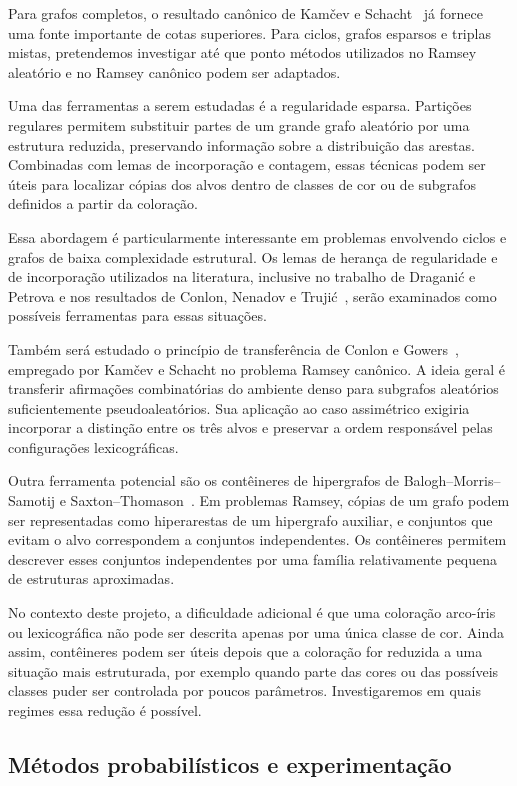 \documentclass[11pt,a4paper]{article}
\theoremstyle{plain}
\theoremstyle{definition}
\begin{document}
Para grafos completos, o resultado canônico de Kamčev e
Schacht~\cite{KS} já fornece uma fonte importante de cotas superiores.
Para ciclos, grafos esparsos e triplas mistas, pretendemos investigar
até que ponto métodos utilizados no Ramsey aleatório e no Ramsey
canônico podem ser adaptados.

Uma das ferramentas a serem estudadas é a regularidade esparsa.
Partições regulares permitem substituir partes de um grande grafo
aleatório por uma estrutura reduzida, preservando informação sobre a
distribuição das arestas. Combinadas com lemas de incorporação e
contagem, essas técnicas podem ser úteis para localizar cópias dos
alvos dentro de classes de cor ou de subgrafos definidos a partir da
coloração.

Essa abordagem é particularmente interessante em problemas envolvendo
ciclos e grafos de baixa complexidade estrutural. Os lemas de herança
de regularidade e de incorporação utilizados na literatura, inclusive
no trabalho de Draganić e Petrova e nos resultados de Conlon,
Nenadov e Trujić~\cite{CNT}, serão examinados como possíveis
ferramentas para essas situações.

Também será estudado o princípio de transferência de Conlon e
Gowers~\cite{CG}, empregado por Kamčev e Schacht no problema Ramsey
canônico. A ideia geral é transferir afirmações combinatórias do
ambiente denso para subgrafos aleatórios suficientemente
pseudoaleatórios. Sua aplicação ao caso assimétrico exigiria incorporar
a distinção entre os três alvos e preservar a ordem responsável pelas
configurações lexicográficas.

Outra ferramenta potencial são os contêineres de hipergrafos de
Balogh--Morris--Samotij e Saxton--Thomason~\cite{BMS,ST}. Em problemas
Ramsey, cópias de um grafo podem ser representadas como hiperarestas
de um hipergrafo auxiliar, e conjuntos que evitam o alvo correspondem
a conjuntos independentes. Os contêineres permitem descrever esses
conjuntos independentes por uma família relativamente pequena de
estruturas aproximadas.

No contexto deste projeto, a dificuldade adicional é que uma
coloração arco-íris ou lexicográfica não pode ser descrita apenas por
uma única classe de cor. Ainda assim, contêineres podem ser úteis
depois que a coloração for reduzida a uma situação mais estruturada,
por exemplo quando parte das cores ou das possíveis classes puder ser
controlada por poucos parâmetros. Investigaremos em quais regimes essa
redução é possível.


\subsection{Métodos probabilísticos e experimentação}
\end{document}
